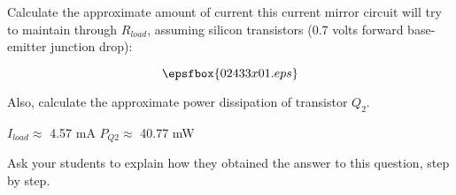 

Calculate the approximate amount of current this current mirror circuit will try to maintain through $R_{load}$, assuming silicon transistors (0.7 volts forward base-emitter junction drop):

$$\epsfbox{02433x01.eps}$$

Also, calculate the approximate power dissipation of transistor $Q_2$.







$I_{load} \approx$ 4.57 mA \hskip 30pt $P_{Q2} \approx $ 40.77 mW







Ask your students to explain how they obtained the answer to this question, step by step.




